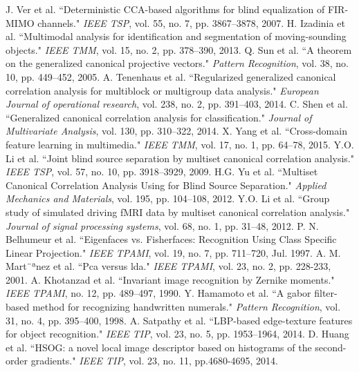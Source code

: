 \documentclass[journal]{IEEEtran}
\begin{document}
\begin{thebibliography}{1}
J. Ver et al. ``Deterministic CCA-based algorithms for blind equalization of FIR-MIMO channels." \emph{IEEE TSP}, vol. 55, no. 7, pp. 3867--3878, 2007.
H. Izadinia et al. ``Multimodal analysis for identification and segmentation of moving-sounding objects." \emph{IEEE TMM}, vol. 15, no. 2, pp. 378--390, 2013.
Q. Sun et al. ``A theorem on the generalized canonical projective vectors." \emph{Pattern Recognition}, vol. 38, no. 10, pp. 449--452, 2005.
 A. Tenenhaus et al. ``Regularized generalized canonical correlation analysis for multiblock or multigroup data analysis." \emph{European Journal of operational research}, vol. 238, no. 2, pp. 391--403, 2014.
C. Shen et al. ``Generalized canonical correlation analysis for classification." \emph{Journal of Multivariate Analysis}, vol. 130, pp. 310--322, 2014.
X. Yang et al. ``Cross-domain feature learning in multimedia." \emph{IEEE TMM}, vol. 17, no. 1, pp. 64--78, 2015.
Y.O. Li et al. ``Joint blind source separation by multiset canonical correlation analysis." \emph{IEEE TSP}, vol. 57, no. 10, pp. 3918--3929, 2009.
H.G. Yu et al. ``Multiset Canonical Correlation Analysis Using for Blind Source Separation." \emph{Applied Mechanics and Materials}, vol. 195, pp. 104--108, 2012.
Y.O. Li et al. ``Group study of simulated driving fMRI data by multiset canonical correlation analysis." \emph{Journal of signal processing systems}, vol. 68, no. 1, pp. 31--48, 2012.
P. N. Belhumeur et al. ``Eigenfaces vs. Fisherfaces: Recognition Using Class Specific Linear Projection." \emph{IEEE TPAMI}, vol. 19, no. 7, pp. 711--720, Jul. 1997.
A. M. Mart¨ªnez et al. ``Pca versus lda." \emph{IEEE TPAMI}, vol. 23, no. 2, pp. 228-233, 2001.
A. Khotanzad et al. ``Invariant image recognition by Zernike moments." \emph{IEEE TPAMI}, no. 12, pp. 489--497, 1990.
Y. Hamamoto et al. ``A gabor filter-based method for recognizing handwritten numerals." \emph{Pattern Recognition}, vol. 31, no. 4, pp. 395--400, 1998.
A. Satpathy et al. ``LBP-based edge-texture features for object recognition." \emph{IEEE TIP}, vol. 23, no. 5, pp. 1953--1964, 2014.
D. Huang et al. ``HSOG: a novel local image descriptor based on histograms of the second-order gradients." \emph{IEEE TIP}, vol. 23, no. 11, pp.4680-4695, 2014.

\end{thebibliography}
\end{document}
